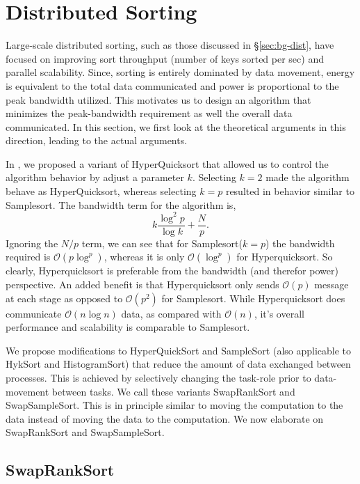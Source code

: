 \section{Distributed Sorting}
\label{sec:dsort}

Large-scale distributed sorting, such as those discussed in \S\ref{sec:bg-dist}, have focused on improving sort throughput (number of keys sorted per sec) and parallel scalability. Since, sorting is entirely dominated by data movement, energy is equivalent to the total data communicated and power is proportional to the peak bandwidth utilized. This motivates us to design an algorithm that minimizes the peak-bandwidth requirement as well the overall data communicated. In this section, we first look at the theoretical arguments in this direction, leading to the actual arguments. 

In \cite{hyksort}, we proposed a variant of HyperQuicksort\cite{wagar87} that allowed us to control the algorithm behavior by adjust a parameter $k$. Selecting $k=2$ made the algorithm behave as HyperQuicksort, whereas selecting $k=p$ resulted in behavior similar to Samplesort. The bandwidth term for the algorithm is,
\begin{equation}
  \label{eq:bw}
    k \frac{\log^2 p}{\log k} + \frac{N}{p}.
\end{equation}   
Ignoring the $N/p$ term, we can see that for Samplesort($k=p$) the bandwidth required is $\mathcal{O}(p\log^ p)$, whereas it is only $\mathcal{O}(\log^ p)$ for Hyperquicksort. So clearly, Hyperquicksort is preferable from the bandwidth (and therefor power) perspective. An added benefit is that Hyperquicksort only sends $\mathcal{O}(p)$ message at each stage as opposed to $\mathcal{O}(p^2)$ for Samplesort. While Hyperquicksort does communicate $\mathcal{O}(n\log n)$ data, as compared with $\mathcal{O}(n)$, it's overall performance and scalability is comparable to Samplesort\cite{hyksort}. 

We propose modifications to HyperQuickSort and SampleSort (also applicable to HykSort and HistogramSort) that reduce the amount of data exchanged between processes. This is achieved by selectively changing the task-role prior to data-movement between tasks. We call these variants {\sc SwapRankSort} and {\sc SwapSampleSort}. This is in principle similar to moving the computation to the data instead of moving the data to the computation. We now elaborate on {\sc SwapRankSort} and {\sc SwapSampleSort}.

\subsection{{\sc SwapRankSort}}

